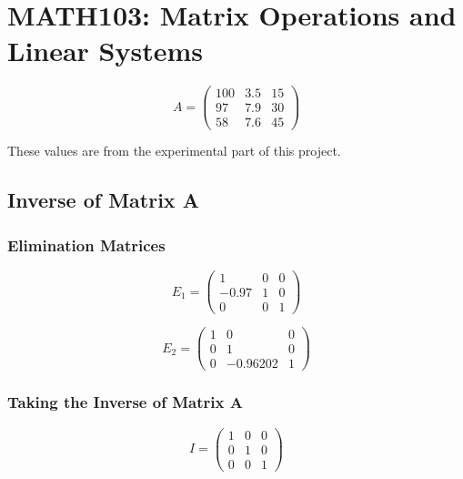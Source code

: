 \chapter{MATH103: Matrix Operations and Linear Systems}

\begin{equation}
    A = \begin{pmatrix}
        100 & 3.5 & 15 \\
        97 & 7.9 & 30 \\
        58 & 7.6 & 45
    \end{pmatrix}
\end{equation}

These values are from the experimental part of this project.

\section{Inverse of Matrix A}

\subsection{Elimination Matrices}

\begin{equation}
    E_1 = \begin{pmatrix}
        1 & 0 & 0 \\
        -0.97 & 1 & 0 \\
        0 & 0 & 1
    \end{pmatrix}
\end{equation}

\begin{equation}
    E_2 = \begin{pmatrix}
        1 & 0 & 0 \\
        0 & 1 & 0 \\
        0 & -0.96202 & 1
    \end{pmatrix}
\end{equation}

\subsection{Taking the Inverse of Matrix A}

\begin{equation}
    I = \begin{pmatrix}
        1 & 0 & 0 \\
        0 & 1 & 0 \\
        0 & 0 & 1
    \end{pmatrix}
\end{equation}

